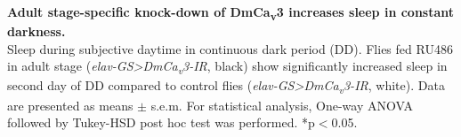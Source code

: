\label{fig:S}
\textbf{Adult stage-specific knock-down of DmCa\textsubscript{v}3 increases sleep in constant darkness.}
\\
Sleep during subjective daytime in continuous dark period (DD). 
Flies fed RU486 in adult stage (\emph{elav-GS\textgreater{}DmCa\textsubscript{v}3-IR}, black) show significantly increased sleep in second day of DD compared to control flies (\emph{elav-GS\textgreater{}DmCa\textsubscript{v}3-IR}, white).
Data are presented as means $\pm$ s.e.m.
For statistical analysis, One-way ANOVA followed by Tukey-HSD post hoc test was performed.
*p$<$0.05.
  
  